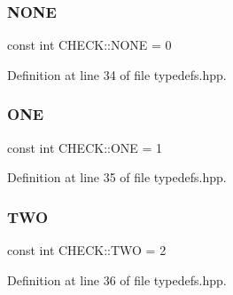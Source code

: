 \subsubsection{\texorpdfstring{N\+O\+NE}{NONE}}
{\footnotesize\ttfamily const int C\+H\+E\+C\+K\+::\+N\+O\+NE = 0}



Definition at line 34 of file typedefs.\+hpp.

\mbox{\label{namespace_c_h_e_c_k_acf8ecf93ddfb75456112712630f8f722}} 
\subsubsection{\texorpdfstring{O\+NE}{ONE}}
{\footnotesize\ttfamily const int C\+H\+E\+C\+K\+::\+O\+NE = 1}



Definition at line 35 of file typedefs.\+hpp.

\mbox{\label{namespace_c_h_e_c_k_a2b112aaec4c59311376a5a60f291aa48}} 
\subsubsection{\texorpdfstring{T\+WO}{TWO}}
{\footnotesize\ttfamily const int C\+H\+E\+C\+K\+::\+T\+WO = 2}



Definition at line 36 of file typedefs.\+hpp.

